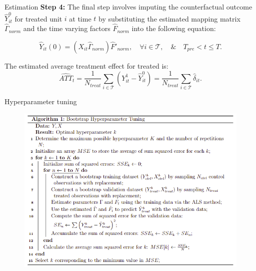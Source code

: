 \documentclass{beamer}
\begin{document}
\begin{frame}{Estimation}
    \textbf{Step 4:} The final step involves imputing the counterfactual outcome $\hat{Y}_{it}^0$ for treated unit $i$ at time $t$ by substituting the estimated mapping matrix $\hat{\Gamma}_{norm}$ and the time varying factors $\hat{F}_{norm}$ into the following equation:
    
    \begin{equation*}
    \hat{Y}_{it}(0) = (X_{it} \hat{\Gamma}_{norm}) \hat{F}'_{norm}, \quad \forall i \in \mathcal{T}, \quad \& \quad T_{pre} < t \leq T.
    \end{equation*}    
    
    The estimated average treatment effect for treated is:
    \begin{equation*}
        \widehat{ATT}_{t} = \frac{1}{N_{treat}}\sum_{i \in \mathcal{T}} \left( Y_{it}^1 - \hat{Y}_{it}^0 \right) = \frac{1}{N_{treat}}\sum_{i \in \mathcal{T}}\hat{\delta}_{it}.
    \end{equation*}
\end{frame}

\begin{frame}{Hyperparameter tuning}
\begin{figure}
    \centering
    \includegraphics[scale=0.8]{figs/boots_tuning.png}
\end{figure}
\end{frame}
\end{document}
